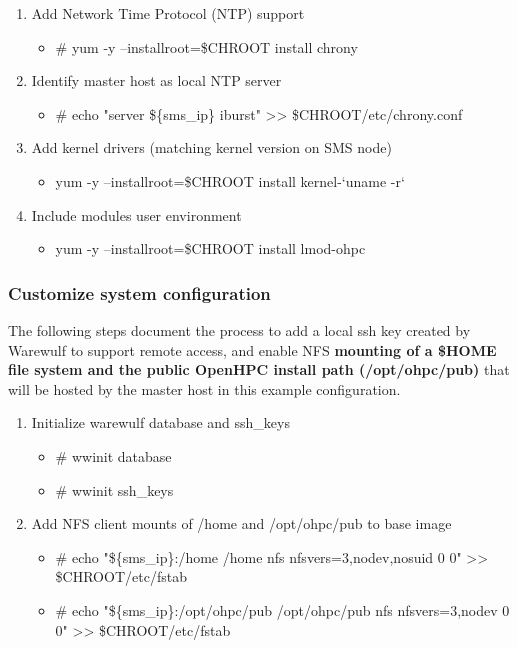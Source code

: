{\begin{enumerate}
\item Add Network Time Protocol (NTP) support
\begin{itemize}
\item \# yum -y --installroot=\$CHROOT install chrony
\end{itemize}

\item Identify master host as local NTP server
\begin{itemize}
\item \# echo "server \$\{sms\_ip\} iburst" >> \$CHROOT/etc/chrony.conf
\end{itemize}

\item Add kernel drivers (matching kernel version on SMS node)
\begin{itemize}
\item yum -y --installroot=\$CHROOT install kernel-`uname -r`
\end{itemize}

\item Include modules user environment
\begin{itemize}
\item yum -y --installroot=\$CHROOT install lmod-ohpc
\end{itemize}
\end{enumerate}



\subsubsection{Customize system configuration}
The following steps document the process to add a local ssh key created by Warewulf to support remote access, and enable NFS \textbf{mounting of a \$HOME file system and the public OpenHPC install path (/opt/ohpc/pub)} that will be hosted by the master host in this example configuration.

\begin{enumerate}
\item Initialize warewulf database and ssh\_keys
\begin{itemize}
\item \# wwinit database
\item \# wwinit ssh\_keys
\end{itemize}

\item Add NFS client mounts of /home and /opt/ohpc/pub to base image
\begin{itemize}
\item \# echo "\$\{sms\_ip\}:/home /home nfs nfsvers=3,nodev,nosuid 0 0" >> \$CHROOT/etc/fstab
\item \# echo "\$\{sms\_ip\}:/opt/ohpc/pub /opt/ohpc/pub nfs nfsvers=3,nodev 0 0" >> \$CHROOT/etc/fstab
\end{itemize}


\end{enumerate}}
